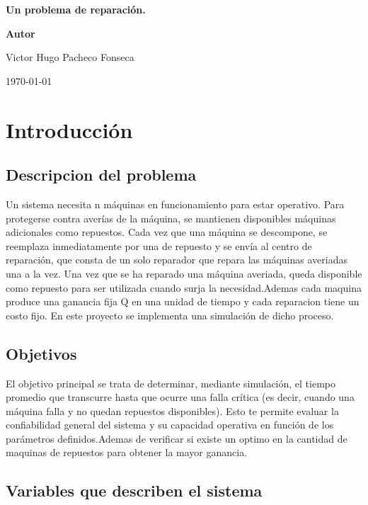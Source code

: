 \documentclass[a4paper,12pt]{article}
\begin{document}
	
	\begin{titlepage}
		\centering
		\vspace{1in}
		{\Huge \bfseries Un problema de reparación.  \par}
		\vspace{1.5in}
		\centering
		\vspace{1in}
		{\Huge \bfseries Autor \par}
		{\Large Victor Hugo Pacheco Fonseca  \par}
		
		\vfill
		{\Large \today \par}
	\end{titlepage}
	
	\tableofcontents
	\newpage
	
	\section{Introducción}
		\subsection{Descripcion del problema}
		Un sistema necesita n máquinas en funcionamiento para estar operativo. Para protegerse contra averías de la máquina, se mantienen disponibles máquinas adicionales como repuestos. Cada vez que una máquina se descompone, se reemplaza inmediatamente por una de repuesto y se envía al centro de reparación, que consta de un solo reparador que repara las máquinas averiadas una a la vez. Una vez que se ha reparado una máquina averiada, queda disponible como repuesto para ser utilizada cuando surja la necesidad.Ademas cada maquina produce una ganancia fija Q en una unidad de tiempo y cada reparacion tiene un costo fijo.
		En este proyecto se implementa una simulación de dicho proceso.
		
		\subsection{Objetivos}
		El objetivo principal se trata de determinar, mediante simulación, el tiempo promedio que transcurre hasta que ocurre una falla crítica (es decir, cuando una máquina falla y no quedan repuestos disponibles). Esto te permite evaluar la confiabilidad general del sistema y su capacidad operativa en función de los parámetros definidos.Ademas de verificar si existe un optimo en la cantidad de maquinas de repuestos para obtener la mayor ganancia.
		
		\subsection{Variables que describen el sistema}
\end{document}
